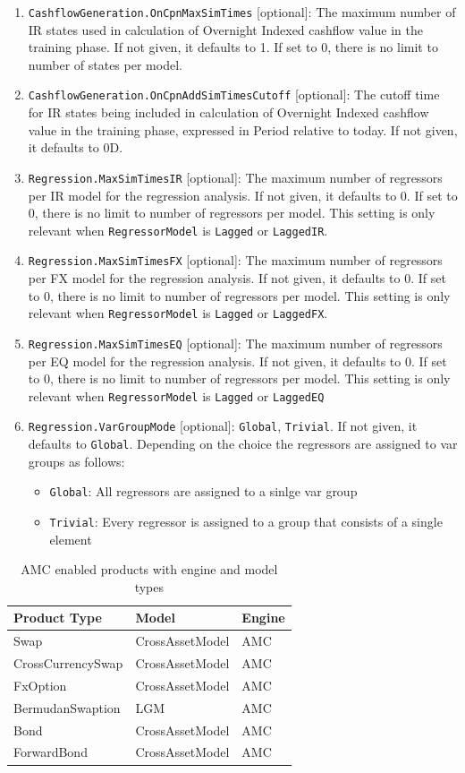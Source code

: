 \documentclass[12pt, a4paper]{article}
\begin{document}
\begin{enumerate}
  date.
\item \verb+CashflowGeneration.OnCpnMaxSimTimes+ [optional]: The maximum number of IR states used in calculation of
  Overnight Indexed cashflow value in the training phase. If not given, it defaults to 1. If set to 0, there is no limit
  to number of states per model.
\item \verb+CashflowGeneration.OnCpnAddSimTimesCutoff+ [optional]: The cutoff time for IR states being included in
  calculation of Overnight Indexed cashflow value in the training phase, expressed in Period relative to today.
  If not given, it defaults to 0D.
\item \verb+Regression.MaxSimTimesIR+ [optional]: The maximum number of regressors per IR model for the regression analysis.
  If not given, it defaults to 0. If set to 0, there is no limit to number of regressors per model. This setting is only
  relevant when \verb+RegressorModel+ is \verb+Lagged+ or \verb+LaggedIR+.
\item \verb+Regression.MaxSimTimesFX+ [optional]: The maximum number of regressors per FX model for the regression analysis.
  If not given, it defaults to 0. If set to 0, there is no limit to number of regressors per model. This setting is only
  relevant when \verb+RegressorModel+ is \verb+Lagged+ or \verb+LaggedFX+.
\item \verb+Regression.MaxSimTimesEQ+ [optional]: The maximum number of regressors per EQ model for the regression analysis.
  If not given, it defaults to 0. If set to 0, there is no limit to number of regressors per model. This setting is only
  relevant when \verb+RegressorModel+ is \verb+Lagged+ or \verb+LaggedEQ+
\item \verb+Regression.VarGroupMode+ [optional]: \verb+Global+, \verb+Trivial+. If not given, it defaults to \verb+Global+.
  Depending on the choice the regressors are assigned to var groups as follows:
    \begin{itemize}
    \item \verb+Global+: All regressors are assigned to a sinlge var group
    \item \verb+Trivial+: Every regressor is assigned to a group that consists of a single element
  \end{itemize}
\end{enumerate}

\begin{table}[hbt]
  \begin{tabular}{l|l|l}
    Product Type & Model & Engine \\ \hline
    Swap & CrossAssetModel & AMC \\
    CrossCurrencySwap & CrossAssetModel & AMC \\
    FxOption & CrossAssetModel & AMC \\
    BermudanSwaption & LGM & AMC \\
    Bond & CrossAssetModel & AMC \\
    ForwardBond & CrossAssetModel & AMC \\
  \end{tabular}
  \caption{AMC enabled products with engine and model types}
  \label{tbl:amcconfig}
\end{table}
\end{document}
